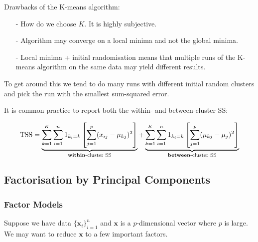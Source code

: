 \documentclass[11pt]{article}
\begin{document}
\begin{shaded}
    Drawbacks of the K-means algorithm:

    \begin{itemize}
        \item[-] How do we choose $K$. It is highly subjective.
        \item[-] Algorithm may converge on a local minima and not the global minima.
        \item[-] Local minima + initial randomisation means that multiple runs of the K-means algorithm on the same data may yield different results. 
    \end{itemize}

    To get around this we tend to do many runs with different initial random clusters and pick the run with the smallest sum-squared error.
\end{shaded}

It is common practice to report both the within- and between-cluster SS:

\begin{equation}
    \text{TSS} = \underbrace{\sum_{k=1}^K \sum_{i=1}^n 1 _{k_i = k}\left[\sum_{j=1}^p (x_{ij} - \mu_{kj})^2\right]}_{\text{\textbf{within}-cluster SS}} + \underbrace{\sum_{k=1}^K \sum_{i=1}^n 1 _{k_i = k}\left[\sum_{j=1}^p (\mu_{kj} - \mu_{j})^2\right]}_{\text{\textbf{between}-cluster SS}}
\end{equation}





\subsection{Factorisation by Principal Components}

\subsubsection{Factor Models}

Suppose we have data $\{\mathbf{x}_i\}_{i=1}^n$ and $\mathbf{x}$ is a $p$-dimensional vector where $p$ is large. We may want to reduce $\mathbf{x}$ to a few important factors.
\end{document}
